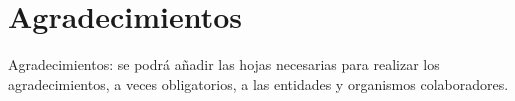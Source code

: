 
\chapter*{Agradecimientos} 

Agradecimientos: se podrá añadir las hojas necesarias para realizar los
agradecimientos, a veces obligatorios, a las entidades y organismos colaboradores.
